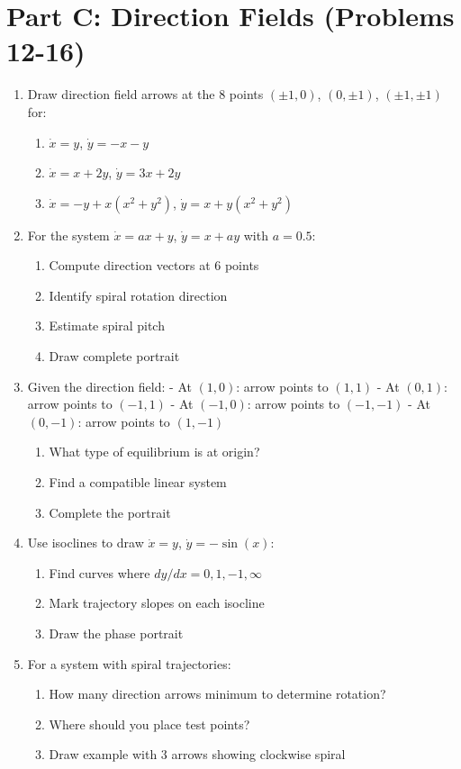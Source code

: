\documentclass[12pt]{article}
\begin{document}
\section*{Part C: Direction Fields (Problems 12-16)}

\begin{enumerate}[resume]
\item Draw direction field arrows at the 8 points $(\pm1, 0)$, $(0, \pm1)$, $(\pm1, \pm1)$ for:
\begin{enumerate}[label=(\alph*)]
    \item $\dot{x} = y$, $\dot{y} = -x - y$
    \item $\dot{x} = x + 2y$, $\dot{y} = 3x + 2y$
    \item $\dot{x} = -y + x(x^{2} + y^{2})$, $\dot{y} = x + y(x^{2} + y^{2})$
\end{enumerate}

\item For the system $\dot{x} = ax + y$, $\dot{y} = x + ay$ with $a = 0.5$:
\begin{enumerate}[label=(\alph*)]
    \item Compute direction vectors at 6 points
    \item Identify spiral rotation direction
    \item Estimate spiral pitch
    \item Draw complete portrait
\end{enumerate}

\item Given the direction field:
- At $(1,0)$: arrow points to $(1,1)$
- At $(0,1)$: arrow points to $(-1,1)$
- At $(-1,0)$: arrow points to $(-1,-1)$
- At $(0,-1)$: arrow points to $(1,-1)$
\begin{enumerate}[label=(\alph*)]
    \item What type of equilibrium is at origin?
    \item Find a compatible linear system
    \item Complete the portrait
\end{enumerate}

\item Use isoclines to draw $\dot{x} = y$, $\dot{y} = -\sin(x)$:
\begin{enumerate}[label=(\alph*)]
    \item Find curves where $dy/dx = 0, 1, -1, \infty$
    \item Mark trajectory slopes on each isocline
    \item Draw the phase portrait
\end{enumerate}

\item For a system with spiral trajectories:
\begin{enumerate}[label=(\alph*)]
    \item How many direction arrows minimum to determine rotation?
    \item Where should you place test points?
    \item Draw example with 3 arrows showing clockwise spiral
\end{enumerate}
\end{enumerate}
\end{document}
